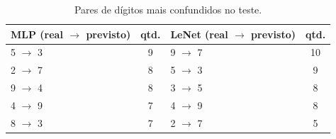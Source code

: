\begin{table}[!t]
\centering
\caption{Pares de dígitos mais confundidos no teste.}
\label{tab:pares}
\begin{tabular}{lclc}
\hline
MLP (real $\to$ previsto) & qtd. & LeNet (real $\to$ previsto) & qtd. \\
\hline
5 $\to$ 3 & 9 & 9 $\to$ 7 & 10 \\
2 $\to$ 7 & 8 & 5 $\to$ 3 & 9 \\
9 $\to$ 4 & 8 & 3 $\to$ 5 & 8 \\
4 $\to$ 9 & 7 & 4 $\to$ 9 & 8 \\
8 $\to$ 3 & 7 & 2 $\to$ 7 & 5 \\
\hline
\end{tabular}
\end{table}